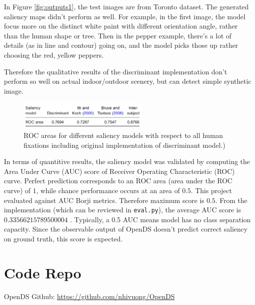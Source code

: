 \documentclass[conference]{IEEEtran}
\begin{document}
In Figure \ref{fig:outputs1}, the test images are from Toronto dataset. The generated saliency maps didn't perform as well. For example, in the first image, the model focus more on the distinct white paint with different orientation angle, rather than the human shape or tree. Then in the pepper example, there's a lot of details (as in line and contour) going on, and the model picks those up rather choosing the red, yellow peppers.

Therefore the qualitative results of the discriminant implementation don't perform so well on actual indoor/outdoor scenery, but can detect simple synthetic image. 

\begin{figure}[h]
    \centering
    \includegraphics[width=2.5in]{score.png}
    \caption{ROC areas for different saliency models with respect to all human fixations including original implementation of discriminant model.) }
    \label{fig:ROCscore}
\end{figure}

In terms of quantitive results, the saliency model was validated by computing the Area Under Curve (AUC) score of Receiver Operating Characteristic (ROC) curve. Perfect prediction corresponds to an ROC area (area under the ROC curve) of $1$, while chance performance occurs at an area of $0.5$. This project evaluated against AUC Borji metrics. Therefore maximum score is $0.5$. From the implementation (which can be reviewed in \texttt{eval.py}), the average AUC score is $0.33566215789500004$ . Typically, a 0.5 AUC means model has no class separation capacity. Since the observable output of OpenDS doesn't predict correct saliency on ground truth, this score is expected.

\section{Code Repo}
OpenDS Github: \url{https://github.com/nhivuong/OpenDS}



\end{document}
